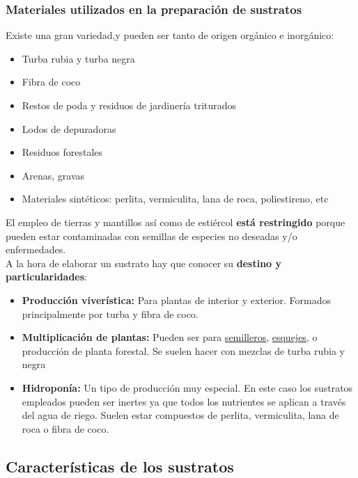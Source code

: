 \documentclass[a4paper,12pt,oneside]{article}
\begin{document}
\subsubsection{Materiales utilizados en la preparación de sustratos}
\label{sec:orgd99d70d}
Existe una gran variedad,y  pueden ser tanto de origen orgánico e inorgánico:
\begin{itemize}
\item Turba rubia y turba negra
\item Fibra de coco
\item Restos de poda y residuos de jardinería triturados
\item Lodos de depuradoras
\item Residuos forestales
\item Arenas, gravas
\item Materiales sintéticos: perlita, vermiculita, lana de roca, poliestireno, etc
\end{itemize}
El empleo de tierras y mantillos así como de estiércol \textbf{está restringido} porque
pueden estar contaminadas con semillas de especies no deseadas y/o
enfermedades.\\
A la hora de elaborar un sustrato hay que conocer su \textbf{destino y
particularidades}:\\
\begin{itemize}
\item \textbf{Producción viverística:} Para plantas de interior y exterior. Formados
principalmente por turba y fibra de coco.
\item \textbf{Multiplicación de plantas:} Pueden ser para \uline{semilleros}, \uline{esquejes}, o
producción de planta forestal. Se suelen hacer con mezclas de turba rubia y negra
\item \textbf{Hidroponía:} Un tipo de producción muy especial. En este caso los sustratos
empleados pueden ser inertes ya que todos los nutrientes se aplican a través
del agua de riego. Suelen estar compuestos de perlita, vermiculita, lana de
roca o fibra de coco.
\end{itemize}
\subsection{Características de los sustratos}
\label{sec:org862a1c6}
\end{document}
